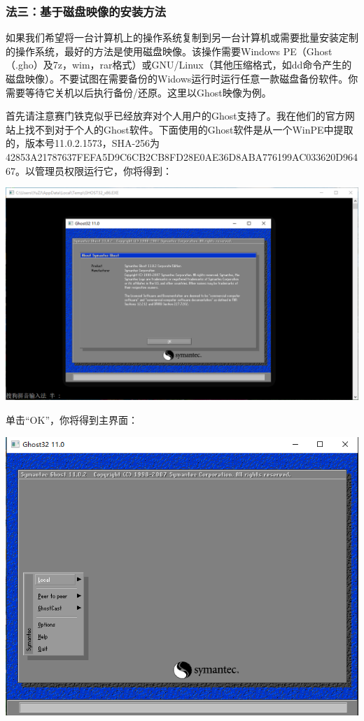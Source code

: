 \subsubsection{法三：基于磁盘映像的安装方法}
如果我们希望将一台计算机上的操作系统复制到另一台计算机或需要批量安装定制的操作系统，最好的方法是使用磁盘映像。该操作需要Windows PE（Ghost（.gho）及7z，wim，rar格式）或GNU/Linux（其他压缩格式，如dd命令产生的磁盘映像）。不要试图在需要备份的Widows运行时运行任意一款磁盘备份软件。你需要等待它关机以后执行备份/还原。这里以Ghost映像为例。\par
首先请注意赛门铁克似乎已经放弃对个人用户的Ghost支持了。我在他们的官方网站上找不到对于个人的Ghost软件。下面使用的Ghost软件是从一个WinPE中提取的，版本号11.0.2.1573，SHA-256为42853A21787637FEFA5D9C6CB2CB8FD28E0AE36D8ABA776199AC033620D96467。以管理员权限运行它，你将得到：
\begin{center}
	\includegraphics[scale=0.5]{pic/sg1}
\end{center}\par
单击“OK”，你将得到主界面：
\begin{center}
	\includegraphics[scale=0.6]{pic/sg2}
\end{center}\par
